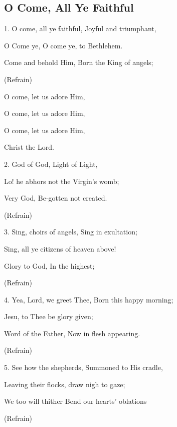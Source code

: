 \subsection{O Come, All Ye Faithful}\label{ye_faithful}
\begin{description}[nosep,leftmargin=\parindent,labelsep=0pt]
\item 1. O come, all ye faithful, Joyful and triumphant, 
\item O Come ye, O come ye, to Bethlehem. 
\item Come and behold Him, Born the King of angels; 
\vspace{1.5ex}
\item (Refrain) 
\item O come, let us adore Him, 
\item O come, let us adore Him, 
\item O come, let us adore Him, 
\item Christ the Lord. 
\vspace{1.5ex}
\item 2. God of God, Light of Light, 
\item Lo! he abhors not the Virgin’s womb; 
\item Very God, Be-gotten not created. 
\item (Refrain) 
\vspace{1.5ex}
\item 3. Sing, choirs of angels, Sing in exultation; 
\item Sing, all ye citizens of heaven above! 
\item Glory to God, In the highest; 
\item (Refrain) 
\vspace{1.5ex}
\item 4. Yea, Lord, we greet Thee, Born this happy morning; 
\item Jesu, to Thee be glory given; 
\item Word of the Father, Now in flesh appearing. 
\item (Refrain) 
\vspace{1.5ex}
\item 5. See how the shepherds, Summoned to His cradle, 
\item Leaving their flocks, draw nigh to gaze; 
\item We too will thither Bend our hearts' oblations 
\item (Refrain) 
\end{description}
